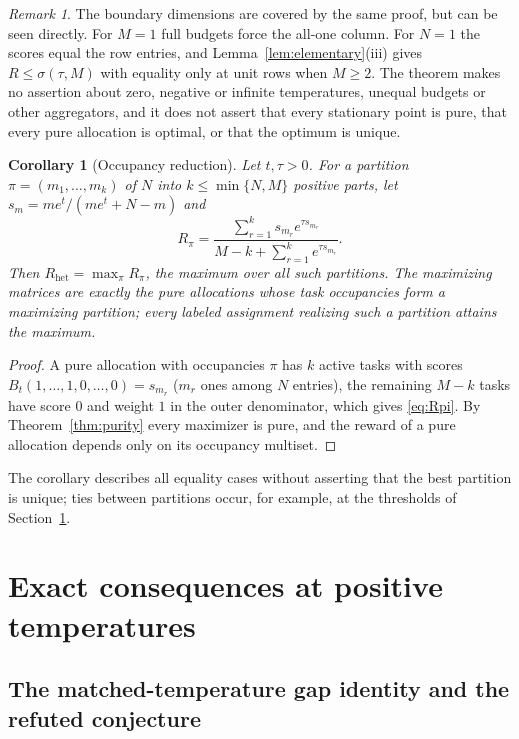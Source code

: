 \documentclass[11pt]{article}
\theoremstyle{plain}
\newtheorem{corollary}[theorem]{Corollary}
\theoremstyle{definition}
\theoremstyle{remark}
\newtheorem{remark}[theorem]{Remark}
\newcommand{\Rhet}{R_{\mathrm{het}}}
\newcommand{\sig}{\sigma}
\begin{document}
\begin{remark}
The boundary dimensions are covered by the same proof, but can be seen directly. For $M=1$ full budgets force the all-one column. For $N=1$ the scores equal the row entries, and Lemma~\ref{lem:elementary}(iii) gives $R\le\sig(\tau,M)$ with equality only at unit rows when $M\ge2$. The theorem makes no assertion about zero, negative or infinite temperatures, unequal budgets or other aggregators, and it does not assert that every stationary point is pure, that every pure allocation is optimal, or that the optimum is unique.
\end{remark}

\begin{corollary}[Occupancy reduction]\label{cor:occupancy}
Let $t,\tau>0$. For a partition $\pi=(m_1,\dots,m_k)$ of $N$ into $k\le\min\{N,M\}$ positive parts, let $s_m=me^t/(me^t+N-m)$ and
\begin{equation}\label{eq:Rpi}
 R_\pi=\frac{\sum_{r=1}^ks_{m_r}e^{\tau s_{m_r}}}{M-k+\sum_{r=1}^ke^{\tau s_{m_r}}}.
\end{equation}
Then $\Rhet=\max_\pi R_\pi$, the maximum over all such partitions. The maximizing matrices are exactly the pure allocations whose task occupancies form a maximizing partition; every labeled assignment realizing such a partition attains the maximum.
\end{corollary}

\begin{proof}
A pure allocation with occupancies $\pi$ has $k$ active tasks with scores $B_t(1,\dots,1,0,\dots,0)=s_{m_r}$ ($m_r$ ones among $N$ entries), the remaining $M-k$ tasks have score $0$ and weight $1$ in the outer denominator, which gives \eqref{eq:Rpi}. By Theorem~\ref{thm:purity} every maximizer is pure, and the reward of a pure allocation depends only on its occupancy multiset.
\end{proof}

The corollary describes all equality cases without asserting that the best partition is unique; ties between partitions occur, for example, at the thresholds of Section~\ref{sec:exact}.

\section{Exact consequences at positive temperatures}\label{sec:exact}

\subsection{The matched-temperature gap identity and the refuted conjecture}\label{sec:gap}
\end{document}
